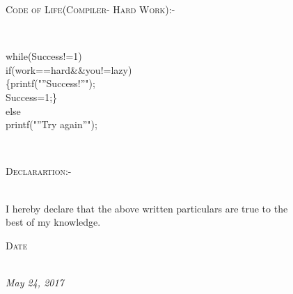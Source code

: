 \documentclass[11pt]{article}
\begin{document}
\begin{figure}[ht]
\begin{minipage}[b]{0.45\linewidth}
\end{minipage}
\begin{minipage}[b]{0.45\linewidth}
\flushleft
\noindent\colorbox{WeakOrange}
{\parbox{\dimexpr\textwidth-2\fboxsep\relax}{\textsc{Code of Life(Compiler- Hard Work):-}}}\\
\vspace{4mm}
\begin{large}
while(Success!=1)\\
\vspace{3mm}
{ if(work==hard\&\&you!=lazy)\\
\vspace{3mm}
\hspace{2mm}      \{printf("”Success!”");\\
\vspace{3mm}
\hspace{2mm}        Success=1;\}\\
\vspace{3mm}
else\\
\vspace{3mm}
\hspace{2mm}      printf("”Try again”"); }\\
\vspace{2.35cm}

\end{large}
\end{minipage}\\
\vspace{3mm}
\noindent\colorbox{WeakOrange}
{\parbox{\dimexpr\textwidth-2\fboxsep\relax}{\textsc{Declarartion:-}}}\\
\vspace{3mm}
I hereby declare that the above written particulars are true to the best of my knowledge.
\begin{flushright}
\noindent\colorbox{WeakOrange}
{\parbox{\dimexpr\textwidth-2\fboxsep\relax}{\begin{flushright}\textsc{Date}\end{flushright}}}\\
\vspace{3mm}
\textit{May 24, 2017}\\

\end{flushright}

\end{figure}
\end{document}
